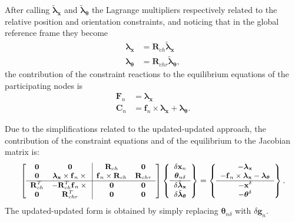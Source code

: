 \documentclass[10pt,dvips,fleqn,subeqn]{report}
\newcommand{\T}[1]{\bm{\mathbf{#1}}}
\begin{document}
After calling $\tilde{\T{\lambda}}_{\T{x}}$
and $\tilde{\T{\lambda}}_{\T{\theta}}$ the Lagrange multipliers
respectively related to the relative position and orientation
constraints, and noticing that in the global reference frame
they become
\begin{subequations}
\begin{align}
	\T{\lambda}_{\T{x}} &= \T{R}_{ch} \tilde{\T{\lambda}}_{\T{x}} \\
	\T{\lambda}_{\T{\theta}} &= \T{R}_{chr} \tilde{\T{\lambda}}_{\T{\theta}} ,
\end{align}
\end{subequations}
the contribution of the constraint reactions to the equilibrium equations
of the participating nodes is
\begin{subequations}
\begin{align}
	\T{F}_n &= \T{\lambda}_{\T{x}} \\
	\T{C}_n &= \T{f}_n \times \T{\lambda}_{\T{x}} + \T{\lambda}_{\T{\theta}} .
\end{align}
\end{subequations}

Due to the simplifications related to the updated-updated approach,
the contribution of the constraint equations and of the equilibrium 
to the Jacobian matrix is: 
\begin{equation}
	\small
	\sqbr{\matr{cc|cc}{
	\T{0} &
	\T{0} &
	\T{R}_{ch} &
	\T{0} \\
	\T{0} &
	\T{\lambda}_{\T{x}}\times\T{f}_n\times{} &
	\T{f}_n\times\T{R}_{ch} & 
	\T{R}_{chr} \\
	\hline
	\T{R}_{ch}^T &
	-\T{R}_{ch}^T\T{f}_n\times{} & 
	\T{0} &
	\T{0} \\
	\T{0} &
	\T{R}_{chr}^T &
	\T{0} & 
	\T{0}
	}} \cubr{\cvvect{
		\delta\T{x}_n \\
		\T{\theta}_{n\delta} \\
		\hline
		\delta\tilde{\T{\lambda}}_{\T{x}} \\
		\delta\tilde{\T{\lambda}}_{\T{\theta}}
	}}
	= \cubr{\cvvect{
	- \T{\lambda}_{\T{x}} \\
	- \T{f}_n \times \T{\lambda}_{\T{x}} - \T{\lambda}_{\T{\theta}} \\
	\hline
	- \T{x}^{\delta} \\
	- \T{\theta}^{\delta}
	}} .
\end{equation}
The updated-updated form is obtained by simply replacing
$\T{\theta}_{n\delta}$ with $\delta\T{g}_n$.
\end{document}
